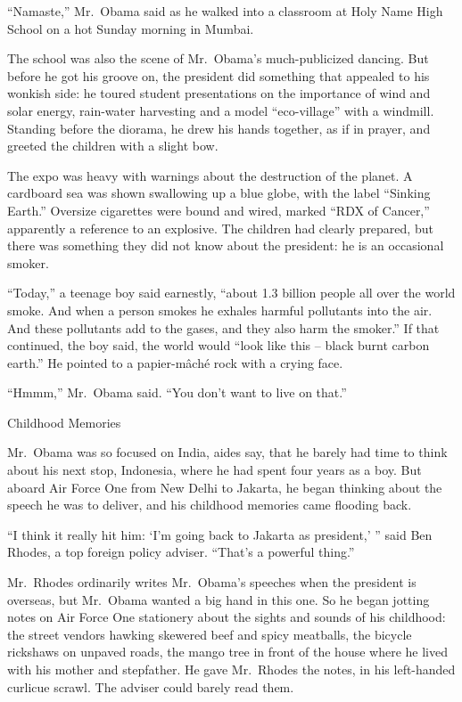 ﻿\documentclass[12pt]{article}
\begin{document}
``Namaste,'' Mr.~Obama said as he walked into a classroom at Holy Name High School on a hot Sunday
morning in Mumbai.

The school was also the scene of Mr.~Obama's much-publicized dancing. But before he got his groove
on, the president did something that appealed to his wonkish side: he toured student presentations
on the importance of wind and solar energy, rain-water harvesting and a model ``eco-village'' with a
windmill. Standing before the diorama, he drew his hands together, as if in prayer, and greeted the
children with a slight bow.

The expo was heavy with warnings about the destruction of the planet. A cardboard sea was shown
swallowing up a blue globe, with the label ``Sinking Earth.'' Oversize cigarettes were bound and
wired, marked ``RDX of Cancer,'' apparently a reference to an explosive. The children had clearly
prepared, but there was something they did not know about the president: he is an occasional smoker.

``Today,'' a teenage boy said earnestly, ``about 1.3 billion people all over the world smoke. And
when a person smokes he exhales harmful pollutants into the air. And these pollutants add to the
gases, and they also harm the smoker.'' If that continued, the boy said, the world would ``look like
this -- black burnt carbon earth.'' He pointed to a papier-m\^{a}ch\'e rock with a crying face.

``Hmmm,” Mr.~Obama said. ``You don't want to live on that.''

Childhood Memories

Mr.~Obama was so focused on India, aides say, that he barely had time to think about his next stop,
Indonesia, where he had spent four years as a boy. But aboard Air Force One from New Delhi to
Jakarta, he began thinking about the speech he was to deliver, and his childhood memories came
flooding back.

``I think it really hit him: `I'm going back to Jakarta as president,' '' said Ben Rhodes, a top
foreign policy adviser. ``That's a powerful thing.''

Mr.~Rhodes ordinarily writes Mr.~Obama's speeches when the president is overseas, but Mr.~Obama
wanted a big hand in this one. So he began jotting notes on Air Force One stationery about the
sights and sounds of his childhood: the street vendors hawking skewered beef and spicy meatballs,
the bicycle rickshaws on unpaved roads, the mango tree in front of the house where he lived with his
mother and stepfather. He gave Mr.~Rhodes the notes, in his left-handed curlicue scrawl. The adviser
could barely read them.
\end{document}
